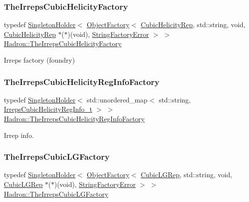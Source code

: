 \subsubsection{\texorpdfstring{TheIrrepsCubicHelicityFactory}{TheIrrepsCubicHelicityFactory}}
{\footnotesize\ttfamily typedef \mbox{\hyperlink{classUtil_1_1SingletonHolder}{Singleton\+Holder}}$<$ \mbox{\hyperlink{classUtil_1_1ObjectFactory}{Object\+Factory}}$<$ \mbox{\hyperlink{structHadron_1_1CubicHelicityRep}{Cubic\+Helicity\+Rep}}, std\+::string, void, \mbox{\hyperlink{structHadron_1_1CubicHelicityRep}{Cubic\+Helicity\+Rep}} $\ast$($\ast$)(void), \mbox{\hyperlink{structUtil_1_1StringFactoryError}{String\+Factory\+Error}} $>$ $>$ \mbox{\hyperlink{namespaceHadron_ae17c10048cdbba5312fcaa06692d632a}{Hadron\+::\+The\+Irreps\+Cubic\+Helicity\+Factory}}}



Irreps factory (foundry) 

\mbox{\label{namespaceHadron_acaa1813cdd4fc3754e8a24a3f0d5267a}} 
\subsubsection{\texorpdfstring{TheIrrepsCubicHelicityRegInfoFactory}{TheIrrepsCubicHelicityRegInfoFactory}}
{\footnotesize\ttfamily typedef \mbox{\hyperlink{classUtil_1_1SingletonHolder}{Singleton\+Holder}}$<$ std\+::unordered\+\_\+map$<$ std\+::string, \mbox{\hyperlink{structHadron_1_1IrrepsCubicHelicityRegInfo__t}{Irreps\+Cubic\+Helicity\+Reg\+Info\+\_\+t}} $>$ $>$ \mbox{\hyperlink{namespaceHadron_acaa1813cdd4fc3754e8a24a3f0d5267a}{Hadron\+::\+The\+Irreps\+Cubic\+Helicity\+Reg\+Info\+Factory}}}



Irrep info. 

\mbox{\label{namespaceHadron_a7b18115fc67c9fdbfd26511633229b99}} 
\subsubsection{\texorpdfstring{TheIrrepsCubicLGFactory}{TheIrrepsCubicLGFactory}}
{\footnotesize\ttfamily typedef \mbox{\hyperlink{classUtil_1_1SingletonHolder}{Singleton\+Holder}}$<$ \mbox{\hyperlink{classUtil_1_1ObjectFactory}{Object\+Factory}}$<$ \mbox{\hyperlink{structHadron_1_1CubicLGRep}{Cubic\+L\+G\+Rep}}, std\+::string, void, \mbox{\hyperlink{structHadron_1_1CubicLGRep}{Cubic\+L\+G\+Rep}} $\ast$($\ast$)(void), \mbox{\hyperlink{structUtil_1_1StringFactoryError}{String\+Factory\+Error}} $>$ $>$ \mbox{\hyperlink{namespaceHadron_a7b18115fc67c9fdbfd26511633229b99}{Hadron\+::\+The\+Irreps\+Cubic\+L\+G\+Factory}}}



